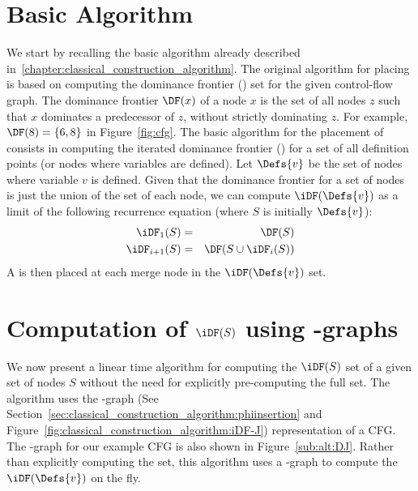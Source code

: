 {\section{Basic Algorithm}
\label{section:alternative_ssa_construction_algorithms:cytron}
We start by recalling the basic algorithm already described in~\ref{chapter:classical_construction_algorithm}. 
The original algorithm for placing \phifuns is based on computing the dominance frontier (\DF) set for the given control-flow graph. 
The dominance frontier $\DF(x)$ of a node $x$ is the set of all nodes $z$ such that $x$ dominates a predecessor of $z$, without strictly dominating $z$. 
For example, $\DF(8)= \{ 6, 8 \}$ in Figure~\ref{fig:cfg}. 
The basic algorithm for the placement of \phifuns consists in computing the 
iterated dominance frontier (\iDF) for a set of all definition points (or nodes 
where variables are defined).  Let $\Defs{v}$ be the set of nodes where 
variable $v$ is defined.  Given that the dominance frontier for a set of nodes 
is just the union of the \DF set of each node, we can compute $\iDF(\Defs{v})$ 
as a limit of the following recurrence equation (where $S$ is initially 
$\Defs{v}$):
\begin{eqnarray*}
\iDF_1(S) &=& \DF(S) \\
\iDF_{i+1} (S) &=& \DF(S \cup \iDF_i(S)) 
\end{eqnarray*}
A \phifun is then placed at each merge node in the  $\iDF(\Defs{v})$ set. 

\section{Computation of $\iDF(S)$ using \DJ-graphs}
\label{section:alternative_ssa_construction_algorithms:sreedhar}
We now present a linear time algorithm for computing the $\iDF(S)$ set of
a given set of nodes $S$ without the need for explicitly pre-computing the full 
\DF set.  The algorithm uses the \DJ-graph (See 
Section~\ref{sec:classical_construction_algorithm:phiinsertion} and 
Figure~\ref{fig:classical_construction_algorithm:iDF-J}) representation of 
a CFG.  The \DJ-graph for our example CFG is also shown in 
Figure~\ref{sub:alt:DJ}.  Rather than explicitly computing the \DF set, this 
algorithm uses a \DJ-graph to compute the $\iDF(\Defs{v})$ on the fly. 

}
